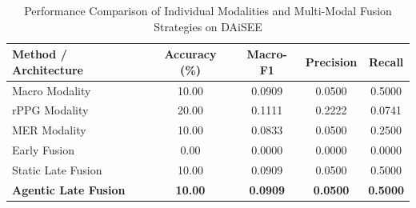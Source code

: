 \begin{table}[htbp]
\centering
\caption{Performance Comparison of Individual Modalities and Multi-Modal Fusion Strategies on DAiSEE}
\label{tab:engagement_results}
\begin{tabular}{lcccc}
\hline
\textbf{Method / Architecture} & \textbf{Accuracy (\%)} & \textbf{Macro-F1} & \textbf{Precision} & \textbf{Recall} \\
\hline
Macro Modality & 10.00 & 0.0909 & 0.0500 & 0.5000 \\
rPPG Modality & 20.00 & 0.1111 & 0.2222 & 0.0741 \\
MER Modality & 10.00 & 0.0833 & 0.0500 & 0.2500 \\
Early Fusion & 0.00 & 0.0000 & 0.0000 & 0.0000 \\
Static Late Fusion & 10.00 & 0.0909 & 0.0500 & 0.5000 \\
\textbf{Agentic Late Fusion} & \textbf{10.00} & \textbf{0.0909} & \textbf{0.0500} & \textbf{0.5000} \\
\hline
\end{tabular}
\end{table}

